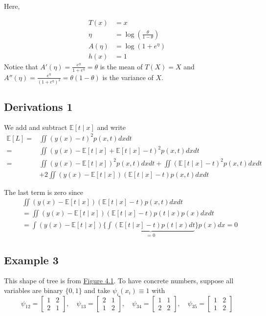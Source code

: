 Here,

\begin{align*}
    T(x) &= x \\
    \eta &= \log \left( \frac{\theta}{1 - \theta} \right) \\
    A(\eta) &= \log(1 + e^{\eta}) \\
    h(x) &= 1
\end{align*}
Notice that \( A'(\eta) = \frac{e^\eta}{1 + e^\eta} = \theta \) is the mean of \( T(X) = X \) and \( A''(\eta) = \frac{e^\eta}{(1 + e^\eta)^2} = \theta (1 - \theta) \) is the variance of \( X \).

\subsection{Derivations 1}
\label{derivations-1}
We add and subtract $\mathbb{E}[t \mid x]$ and write
$$
\begin{aligned}
\mathbb{E}[L]= & \iint(y(x)-t)^2 p(x, t) d x d t \\
= & \iint(y(x)-\mathbb{E}[t \mid x]+\mathbb{E}[t \mid x]-t)^2 p(x, t) d x d t \\
= & \iint(y(x)-\mathbb{E}[t \mid x])^2 p(x, t) d x d t+\iint(\mathbb{E}[t \mid x]-t)^2 p(x, t) d x d t \\
& +2 \iint(y(x)-\mathbb{E}[t \mid x])(\mathbb{E}[t \mid x]-t) p(x, t) d x d t
\end{aligned}
$$

The last term is zero since
$$
\begin{aligned}
& \iint(y(x)-\mathbb{E}[t \mid x])(\mathbb{E}[t \mid x]-t) p(x, t) d x d t \\
& =\iint(y(x)-\mathbb{E}[t \mid x])(\mathbb{E}[t \mid x]-t) p(t \mid x) p(x) d x d t \\
& =\int(y(x)-\mathbb{E}[t \mid x])\{\underbrace{\int(\mathbb{E}[t \mid x]-t) p(t \mid x) d t}_{=0}\} p(x) d x=0
\end{aligned}
$$

\subsection{Example 3}
\label{example-3}
This shape of tree is from \hyperref[fig:tree]{Figure 4.1}. To have concrete numbers, suppose all variables are binary $\{0,1\}$ and take $\psi_i\left(x_i\right) \equiv 1$ with
$$
\psi_{12}=\left[\begin{array}{ll}
1 & 2 \\
2 & 1
\end{array}\right], \quad \psi_{13}=\left[\begin{array}{ll}
2 & 1 \\
1 & 2
\end{array}\right], \quad \psi_{34}=\left[\begin{array}{ll}
1 & 1 \\
2 & 2
\end{array}\right], \quad \psi_{35}=\left[\begin{array}{ll}
1 & 2 \\
1 & 2
\end{array}\right]
$$

